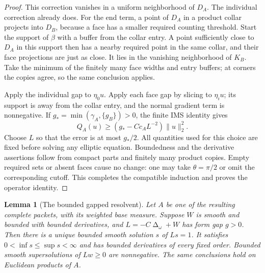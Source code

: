 \documentclass[11pt]{article}
\numberwithin{equation}{section}
\newtheorem{lemma}[theorem]{Lemma}
\theoremstyle{definition}
\theoremstyle{remark}
\begin{document}
\begin{proof}
This correction vanishes in a uniform neighborhood of $D_A$.  The
individual correction already does.  For the end term, a point of
$D_A$ in a product collar projects into $D_B$, because a face has a
smaller required counting threshold.  Start the support of $\beta$
with a buffer from the collar entry.  A point sufficiently close to
$D_A$ in this support then has a nearby required point in the same
collar, and their face projections are just as close.  It lies in the
vanishing neighborhood of $K_B$.  Take the minimum of the finitely
many face widths and entry buffers; at corners the copies agree, so
the same conclusion applies.

Apply the individual gap to $\eta_0u$.  Apply each face gap by slicing
to $\eta_iu$; its support is away from the collar entry, and the
normal gradient term is nonnegative.  If
$g_* =\min(\gamma_A,\{g_B\})>0$, the finite IMS identity gives
\[
 Q_A(u)\ge(g_*-Cc_A L^{-2})\|u\|_2^2.
\]
Choose $L$ so that the error is at most $g_*/2$.  All quantities used
for this choice are fixed before solving any elliptic equation.
Boundedness and the derivative assertions follow from compact parts
and finitely many product copies.  Empty required sets or absent faces
cause no change: one may take $\theta=\pi/2$ or omit the corresponding
cutoff.  This completes the compatible induction and proves the
operator identity.
\end{proof}

\begin{lemma}[The bounded gapped resolvent]\label{regular:resolvent}
Let $A$ be one of the resulting complete packets, with its weighted
base measure.  Suppose $W$ is smooth and bounded with bounded
derivatives, and $L=-C\operatorname{\Delta}_\omega+W$ has form gap $g>0$.  Then
there is a unique bounded smooth solution $s$ of $Ls=1$.
It satisfies $0<\inf s\le\sup s<\infty$ and has bounded derivatives
of every fixed order.  Bounded smooth supersolutions of $Lw\ge0$ are
nonnegative.  The same conclusions hold on Euclidean products of $A$.
\end{lemma}
\end{document}
